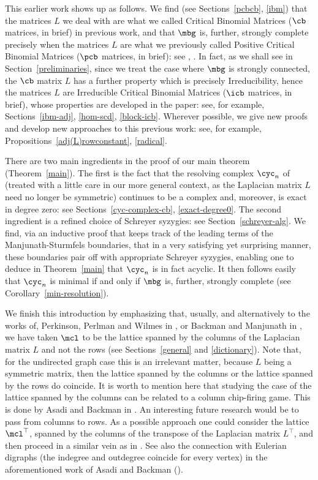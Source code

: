 This earlier work shows up as follows. We find (see
Sections~\ref{pcbcb}, \ref{ibm}) that the matrices $L$ we deal with
are what we called Critical Binomial Matrices ($\cb$ matrices, in
brief) in previous work, and that $\mbg$ is, further, strongly
complete precisely when the matrices $L$ are what we previously called
Positive Critical Binomial Matrices ($\pcb$ matrices, in brief): see
\cite{op}, \cite{opv}. In fact, as we shall see in
Section~\ref{preliminaries}, since we treat the case where $\mbg$ is
strongly connected, the $\cb$ matrix $L$ has a further property which
is precisely Irreducibility, hence the matrices $L$ are Irreducible
Critical Binomial Matrices ($\icb$ matrices, in brief), whose
properties are developed in the paper: see, for example,
Sections~\ref{ibm-adj}, \ref{hom-scd}, \ref{block-icb}. Wherever
possible, we give new proofs and develop new approaches to this
previous work: see, for example, Propositions~\ref{adj(L)rowconstant},
\ref{radical}.

There are two main ingredients in the proof of our main theorem
(Theorem~\ref{main}). The first is the fact that the resolving complex
$\cyc_n$ of \cite{ms} (treated with a little care in our more general
context, as the Laplacian matrix $L$ need no longer be symmetric)
continues to be a complex and, moreover, is exact in degree zero: see
Sections~\ref{cyc-complex-cb}, \ref{exact-degree0}.  The second
ingredient is a refined choice of Schreyer syzygies: see
Section~\ref{schreyer-alg}. We find, via an inductive proof that keeps
track of the leading terms of the Manjunath-Sturmfels boundaries, that
in a very satisfying yet surprising manner, these boundaries pair off
with appropriate Schreyer syzygies, enabling one to deduce in
Theorem~\ref{main} that $\cyc_n$ is in fact acyclic.  It then follows
easily that $\cyc_n$ is minimal if and only if $\mbg$ is, further,
strongly complete (see Corollary~\ref{min-resolution}).

We finish this introduction by emphasizing that, usually, and
alternatively to the works of, \eg Perkinson, Perlman and Wilmes in
\cite{ppw}, or Backman and Manjunath in \cite{bm}, we have taken
$\mcl$ to be the lattice spanned by the columns of the Laplacian
matrix $L$ and not the rows (see Sections~\ref{general} and
\ref{dictionary}). Note that, for the undirected graph case this is an
irrelevant matter, because $L$ being a symmetric matrix, then the
lattice spanned by the columns or the lattice spanned by the rows do
coincide. It is worth to mention here that studying the case of the
lattice spanned by the columns can be related to a column chip-firing
game. This is done by Asadi and Backman in \cite[Introduction and
  Section~3.2]{ab}. An interesting future research would be to pass
from columns to rows. As a possible approach one could consider the
lattice $\mcl^{\top}$, spanned by the columns of the transpose of the
Laplacian matrix $L^{\top}$, and then proceed in a similar vein as in
\cite{opv}. See also the connection with Eulerian digraphs (the
indegree and outdegree coincide for every vertex) in the
aforementioned work of Asadi and Backman (\cite[Theorem~3.18]{ab}).

